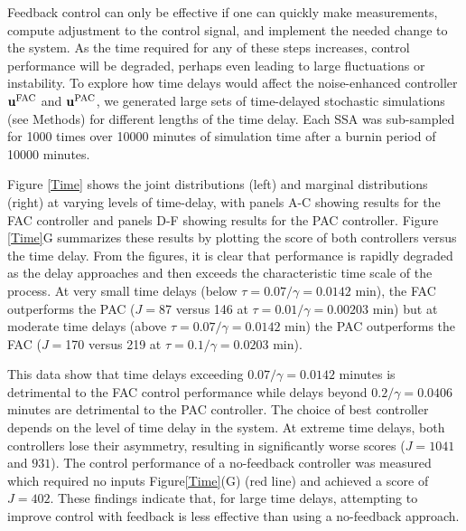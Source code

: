 \documentclass[12pt]{iopart}
\begin{document}
Feedback control can only be effective if one can quickly make measurements, compute adjustment to the control signal, and implement the needed change to the system. As the time required for any of these steps increases, control performance will be degraded, perhaps even leading to large fluctuations or instability. To explore how time delays would affect the noise-enhanced controller $\mathbf{u}^{\rm FAC}$ and $\mathbf{u}^{\rm PAC}$, we generated large sets of time-delayed stochastic simulations (see Methods) for different lengths of the time delay. Each SSA was sub-sampled for 1000 times over 10000 minutes of simulation time after a burnin period of 10000 minutes.

Figure \ref{Time} shows the joint distributions (left) and marginal distributions (right) at varying levels of time-delay, with panels A-C showing results for the FAC controller and panels D-F showing results for the PAC controller. Figure \ref{Time}G summarizes these results by plotting the score of both controllers versus the time delay. From the figures, it is clear that performance is rapidly degraded as the delay approaches and then exceeds the characteristic time scale of the process. At very small time delays (below $\tau = 0.07/\gamma = 0.0142$ min), the FAC outperforms the PAC ($J=$87 versus 146 at $\tau = 0.01/\gamma = 0.00203$ min) but at moderate time delays (above $\tau = 0.07/\gamma = 0.0142$ min) the PAC outperforms the FAC ($J=$170 versus 219 at $\tau = 0.1/\gamma = 0.0203$ min). 

This data show that time delays exceeding $0.07 / \gamma = 0.0142$ minutes is detrimental to the FAC control performance while delays beyond $0.2 / \gamma = 0.0406$ minutes are detrimental to the PAC controller. The choice of best controller depends on the level of time delay in the system. At extreme time delays, both controllers lose their asymmetry, resulting in significantly worse scores ($J = 1041$ and $931$). The control performance of a no-feedback controller was measured which required no inputs Figure\ref{Time}(G) (red line) and achieved a score of $J = 402$. These findings indicate that, for large time delays, attempting to improve control with feedback is less effective than using a no-feedback approach.

\end{document}
